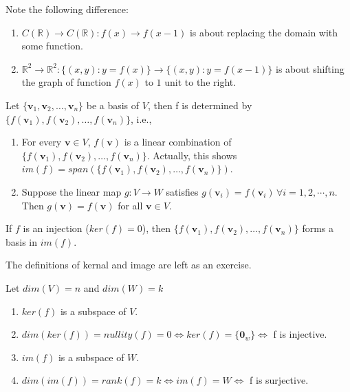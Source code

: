 \documentclass[12pt]{article}
\begin{document}
\begin{pbox}
\begin{remark}
Note the following difference:
\begin{enumerate}
    \item $C(\mathbb{R}) \rightarrow  C(\mathbb{R}): f(x)\rightarrow f(x-1)$ is about replacing the domain with some function.
    \item $\mathbb{R}^2\rightarrow\mathbb{R}^2: \{(x,y): y=f(x)\}\rightarrow \{(x,y): y=f(x-1)\}$ is about shifting the graph of function $f(x)$ to $1$ unit to the right.
\end{enumerate}
\end{remark}
\end{pbox}

\begin{theorem}
    Let $\{\mathbf{v}_1,\mathbf{v}_2,\ldots,\mathbf{v}_n\}$ be a basis of $V$, then f is determined by $\{f(\mathbf{v}_1),f(\mathbf{v}_2),\ldots,f(\mathbf{v}_n)\}$, i.e., 
\begin{enumerate}
    \item For every $\mathbf{v}\in V$, $f(\mathbf{v})$ is a linear combination of $\{f(\mathbf{v}_1),f(\mathbf{v}_2),\ldots,f(\mathbf{v}_n)\}$. Actually, this shows $im(f)=span(\{f(\mathbf{v}_1),f(\mathbf{v}_2),\ldots,f(\mathbf{v}_n)\}).$
    \item Suppose the linear map $g: V\rightarrow W$ satisfies $g(\mathbf{v}_i)=f(\mathbf{v}_i)\, \forall i=1,2,\cdots ,n$. Then $g(\mathbf{v})=f(\mathbf{v})$ for all $\mathbf{v}\in V.$ 
\end{enumerate}
\end{theorem}

\begin{corollary}
    If $f$ is an injection ($ker(f)=0$), then $\{f(\mathbf{v}_1),f(\mathbf{v}_2),\ldots,f(\mathbf{v}_n)\}$ forms a basis in $im(f)$.
\end{corollary}

The definitions of kernal and image are left as an exercise.

\begin{theorem}
    Let $dim(V)=n$ and $dim(W)=k$
    \begin{enumerate}
        \item $ker(f)$ is a subspace of $V$.
        \item $dim(ker(f))=nullity(f)=0\Leftrightarrow ker(f)=\{\mathbf{0}_w\}\Leftrightarrow$ f is injective.
        \item $im(f)$ is a subspace of $W$.
        \item $dim(im(f))=rank(f)=k\Leftrightarrow im(f)=W\Leftrightarrow$ f is surjective.
    \end{enumerate}
\end{theorem}
\end{document}
